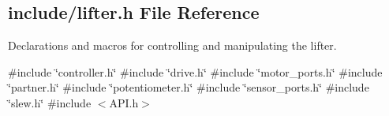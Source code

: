 \subsection{include/lifter.h File Reference}
\label{a00026}


Declarations and macros for controlling and manipulating the lifter.  


{\ttfamily \#include \char`\"{}controller.\+h\char`\"{}}\newline
{\ttfamily \#include \char`\"{}drive.\+h\char`\"{}}\newline
{\ttfamily \#include \char`\"{}motor\+\_\+ports.\+h\char`\"{}}\newline
{\ttfamily \#include \char`\"{}partner.\+h\char`\"{}}\newline
{\ttfamily \#include \char`\"{}potentiometer.\+h\char`\"{}}\newline
{\ttfamily \#include \char`\"{}sensor\+\_\+ports.\+h\char`\"{}}\newline
{\ttfamily \#include \char`\"{}slew.\+h\char`\"{}}\newline
{\ttfamily \#include $<$A\+P\+I.\+h$>$}\newline
